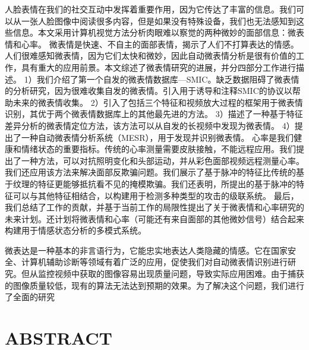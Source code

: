 人脸表情在我们的社交互动中发挥着重要作用，因为它传达了丰富的信息。我们可以从一张人脸图像中阅读很多内容，但是如果没有特殊设备，我们也无法感知到这些信息。本文采用计算机视觉方法分析肉眼难以察觉的两种微妙的面部信息：微表情和心率。
微表情是快速、不自主的面部表情，揭示了人们不打算表达的情感。人们很难感知微表情，因为它们太快和微妙，因此自动微表情分析是很有价值的工作，具有重大的应用前景。本文综述了微表情研究的进展，并分四部分工作进行描述。 1）我们介绍了第一个自发的微表情数据库—SMIC。缺乏数据阻碍了微表情的分析研究，因为很难收集自发的微表情。引入用于诱导和注释SMIC的协议以帮助未来的微表情收集。 2）引入了包括三个特征和视频放大过程的框架用于微表情识别，其优于两个微表情数据库上的其他最先进的方法。 3）描述了一种基于特征差异分析的微表情定位方法，该方法可以从自发的长视频中发现为微表情。 4）提出了一种自动微表情分析系统（MESR），用于发现并识别微表情。
心率是我们健康和情绪状态的重要指标。传统的心率测量需要皮肤接触，不能远程应用。我们提出了一种方法，可以对抗照明变化和头部运动，并从彩色面部视频远程测量心率。我们还应用该方法来解决面部反欺骗问题。我们展示了基于脉冲的特征比传统的基于纹理的特征更能够抵抗看不见的掩模欺骗。我们还表明，所提出的基于脉冲的特征可以与其他特征相结合，以构建用于检测多种类型的攻击的级联系统。
最后，我们总结了工作的贡献，并基于当前工作的局限性提出了关于微表情和心率研究的未来计划。还计划将微表情和心率（可能还有来自面部的其他微妙信号）结合起来构建用于情感状态分析的多模式系统。

微表达是一种基本的非言语行为，它能忠实地表达人类隐藏的情感。它在国家安全、计算机辅助诊断等领域有着广泛的应用，促使我们对自动微表情识别进行研究。但从监控视频中获取的图像容易出现质量问题，导致实际应用困难。由于捕获的图像质量较低，现有的算法无法达到预期的效果。为了解决这个问题，我们进行了全面的研究


\chapter{ABSTRACT}%

